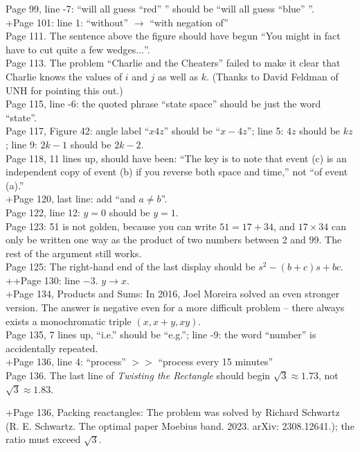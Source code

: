 \documentclass[11pt]{article}
\begin{document}
Page 99, line -7: ``will all guess ``red'' '' should be ``will all guess ``blue'' ''. \\

+Page 101: line 1: ``without'' $\to$ ``with negation of''\\

Page 111. The sentence above the figure should have begun ``You might in fact have to
cut quite a few wedges$\dots$''.\\

Page 113. The problem ``Charlie and the Cheaters'' failed to make it clear that Charlie knows
the values of $i$ and $j$ as well as $k$.  (Thanks to David Feldman of UNH for pointing this out.) \\

Page 115, line -6: the quoted phrase ``state space'' should be just the word ``state''. \\

Page 117, Figure 42: angle label ``$x4z$'' should be ``$x-4z$''; line 5: $4z$ should be $kz$;
line 9: $2k{-}1$ should be $2k{-}2$.\\

Page 118, 11 lines up, should have been: ``The key is to note that event (c) is an independent copy of event (b) if you reverse
both space and time,'' not ``of event (a).''\\

+Page 120, last line: add ``and $a\ne b$''.\\

Page 122, line 12: $y=0$ should be $y=1$.\\

Page 123: 51 is not golden, because you can write $51=17+34$, and $17 \times 34$ can only be written one
way as the product of two numbers between 2 and 99.  The rest of the argument still works.\\

Page 125: The right-hand end of the last display should be $s^2-(b+c)s+bc$.\\

++Page 130: line $-3$. $y \to x$.\\

+Page 134, Products and Sums: In 2016, Joel Moreira solved an even stronger version. The answer is negative even for a more difficult problem – there always exists a monochromatic triple $ (x, x + y, xy)$.\\

Page 135, 7 lines up,  ``i.e.'' should be ``e.g.'';
line -9: the word ``number'' is accidentally repeated.\\

+Page 136, line 4: ``process'' $>>$ ``process every 15 minutes''\\

Page 136. The last line of {\em Twisting the Rectangle} should begin $\sqrt{3}\approx 1.73$, not
$\sqrt{3}\approx 1.83$.

+Page 136, Packing reactangles: The problem was solved by Richard Schwartz (R. E. Schwartz. The optimal paper Moebius band. 2023. arXiv: 2308.12641.); the ratio must exceed $\sqrt{3}$.\\
\end{document}
